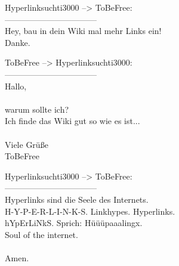 \noindent \parbox{\textwidth}{

    \begin{footnotesize}
    \begin{itshape}

\noindent Hyperlinksuchti3000 --> ToBeFree:\\
\noindent ---------------------------------\\
\noindent Hey, bau in dein Wiki mal mehr Links ein!\\
\noindent Danke.\\

    \end{itshape}
    \end{footnotesize}

}


\noindent \parbox{\textwidth}{

    \begin{footnotesize}
    \begin{itshape}
    \begin{flushright}

\noindent ToBeFree --> Hyperlinksuchti3000:\\
\noindent ---------------------------------\\
\noindent Hallo,\\
\noindent ~\\
\noindent warum sollte ich?\\
\noindent Ich finde das Wiki gut so wie es ist...\\
\noindent ~\\
\noindent Viele Grüße\\
\noindent ToBeFree\\

    \end{flushright}
    \end{itshape}
    \end{footnotesize}

}

\noindent \parbox{\textwidth}{

    \begin{footnotesize}
    \begin{itshape}

\noindent Hyperlinksuchti3000 --> ToBeFree:\\
\noindent ---------------------------------\\
\noindent Hyperlinks sind die Seele des Internets.\\
\noindent H-Y-P-E-R-L-I-N-K-S. Linkhypes. Hyperlinks.\\
\noindent hYpErLiNkS. Sprich: Hüüüpaaalingx.\\
\noindent Soul of the internet.\\
\noindent ~\\
\noindent Amen.\\

    \end{itshape}
    \end{footnotesize}

}


